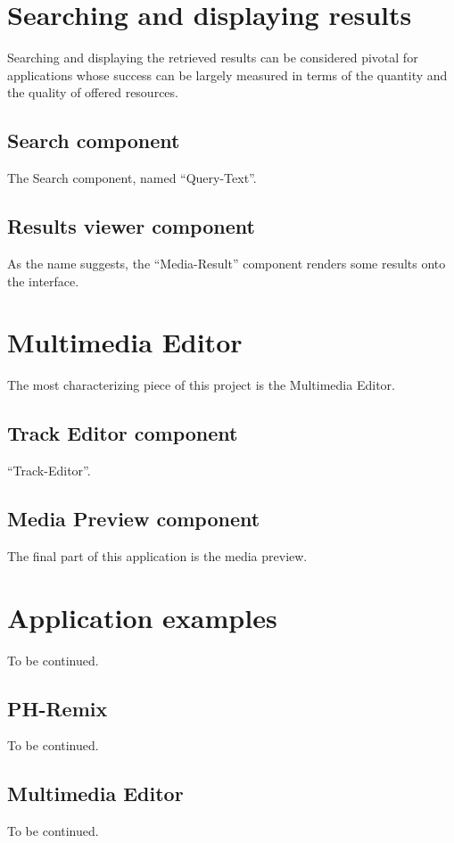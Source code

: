 \section{Searching and displaying results}

Searching and displaying the retrieved results can be considered pivotal for applications whose success can be largely measured in terms of the quantity and the quality of offered resources.

\subsection{Search component}

The Search component, named “Query-Text”.

\subsection{Results viewer component}

As the name suggests, the “Media-Result” component renders some results onto the interface.

\section{Multimedia Editor}

The most characterizing piece of this project is the Multimedia Editor.

\subsection{Track Editor component}

“Track-Editor”.

\subsection{Media Preview component}

The final part of this application is the media preview. 

\section{Application examples}

To be continued.

\subsection{PH-Remix}

To be continued.

\subsection{Multimedia Editor}

To be continued.